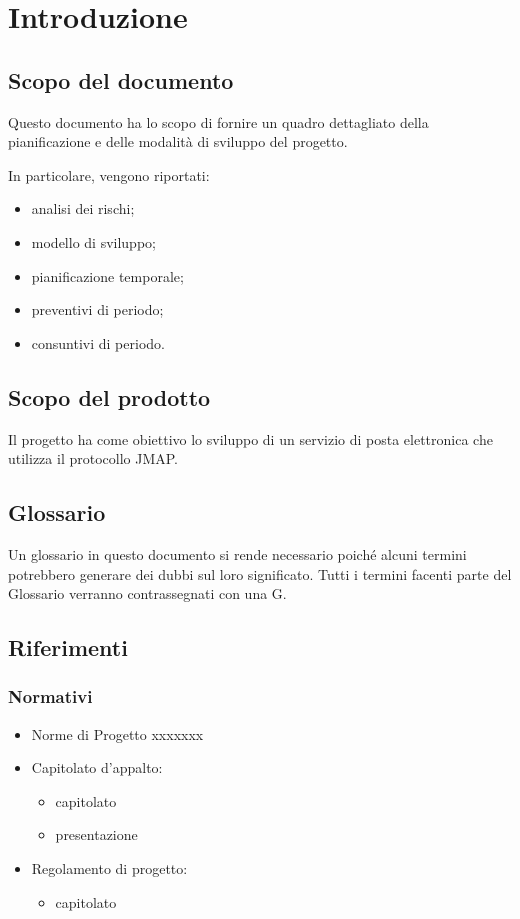 \section{Introduzione} \label{sec:introduzione}
    \subsection{Scopo del documento}
    Questo documento ha lo scopo di fornire un quadro dettagliato della pianificazione e delle modalità di sviluppo del progetto.

    \noindent
    In particolare, vengono riportati:
    \begin{itemize}
        \item analisi dei rischi;
        \item modello di sviluppo;
        \item pianificazione temporale;
        \item preventivi di periodo;
        \item consuntivi di periodo.
    \end{itemize}

    \subsection{Scopo del prodotto}
    Il progetto ha come obiettivo lo sviluppo di un servizio di posta elettronica che utilizza il protocollo JMAP.

    \subsection{Glossario}
        Un glossario in questo documento si rende necessario poiché alcuni termini potrebbero generare dei dubbi sul loro significato.
        Tutti i termini facenti parte del Glossario verranno contrassegnati con una G.

    \subsection{Riferimenti} 
    \subsubsection{Normativi}
    \begin{itemize}
        \item Norme di Progetto xxxxxxx %
        \item Capitolato d'appalto: %
        \begin{itemize}
            \item capitolato
            \item presentazione
        \end{itemize}
        \item Regolamento di progetto: %
        \begin{itemize}
            \item capitolato
        \end{itemize}
    \end{itemize}

